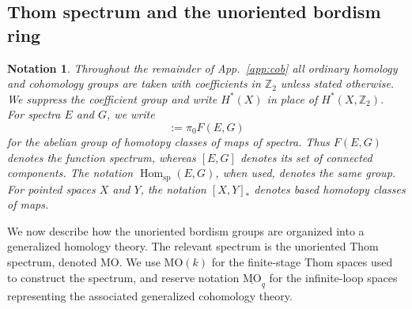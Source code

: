 \documentclass[aps,prx,reprint,superscriptaddress,twocolumn,amsmath,amssymb,amsfonts, nofootinbib]{revtex4-2}
\theoremstyle{apsstyle}
\newtheorem{notation}{Notation}
\begin{document}
\subsection{Thom spectrum and the unoriented bordism ring}
\label{app:cob_spectrum_description}

\begin{notation}
\label{notation:mod2_coefficients_cobordism}
Throughout the remainder of App.~\ref{app:cob} all ordinary homology and cohomology groups are taken with coefficients in $\mathbb Z_{2}$ unless stated otherwise. We suppress the coefficient group and write $H^{*}(X)$ in place of $H^{*}(X,\mathbb Z_{2})$.\\
\noindent For spectra $E$ and $G$, we write \begin{equation*} [E,G] := \pi_0F(E,G) \end{equation*} for the abelian group of homotopy classes of maps of spectra. Thus $F(E,G)$ denotes the function spectrum, whereas $[E,G]$ denotes its set of connected components. The notation $\operatorname{Hom}_{\mathrm{sp}}(E,G)$, when used, denotes the same group. For pointed spaces $X$ and $Y$, the notation $[X,Y]_*$ denotes based homotopy classes of maps.
\end{notation}

\bigskip 

We now describe how the unoriented bordism groups are organized into a generalized homology theory. The relevant spectrum is the unoriented Thom spectrum, denoted $\mathrm{MO}$. We use $\mathrm{MO}(k)$ for the finite-stage Thom spaces used to construct the spectrum, and reserve notation $\underline{\mathrm{MO}}_{q}$ for the infinite-loop spaces representing the associated generalized cohomology theory.

\medskip 
\end{document}
